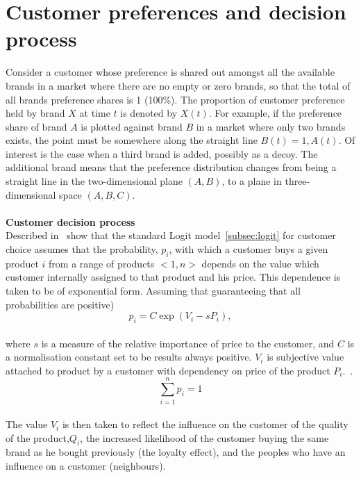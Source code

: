 \section{Customer preferences and decision process} \label{sec:customer_preferences}
Consider a customer whose preference is shared out amongst all the available brands in a market where there are
no empty or zero brands, so that the total of all brands preference shares is 1 (100\%).
The proportion of customer preference held by brand $X$ at time $t$ is denoted by $X(t)$.
For example, if the preference share of brand $A$ is plotted against brand $B$ in a market where only two brands exists,
the point must be somewhere along the straight line $B(t) = 1, A(t)$.
Of interest is the case when a third brand is added, possibly as a decoy.
The additional brand means that the preference distribution changes from being a straight line in the two-dimensional plane $(A, B)$,
to a plane in three-dimensional space $(A,B,C)$.\\
\\
\textbf{Customer decision process} \label{sec:cus_decision}\\
Described in~\cite{patel} show that the standard Logit model~\ref{subsec:logit} for customer choice assumes that
the probability, $p_i$, with which a customer buys a given product $i$ from a range of products $<1, n>$ depends on
the value which customer internally assigned to that product and his price.
This dependence is taken to be of exponential form.
Assuming that guaranteeing that all probabilities are positive)
\\
\begin{equation} \label{eq:7}
p_i = C\exp(V_i - sP_i),
\end{equation}
\\
where $s$ is a measure of the relative importance of price to the customer, and $C$ is a normalisation constant set to be results always positive. $V_i$ is subjective value
attached to product by a customer with dependency on price of the product $P_i$.~\cite{patel}.
\\
\begin{equation} \label{eq:8}
\sum_{i=1}^n p_i = 1
\end{equation}
\\
The value $V_i$ is then taken to reflect the influence on the customer of the quality of the product,$Q_i$,
the increased likelihood of the customer buying the same brand as he bought previously (the loyalty effect),
and the peoples who have an influence on a customer (neighbours).
